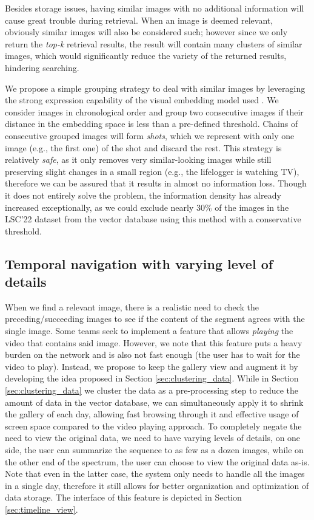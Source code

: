 Besides storage issues, having similar images with no additional information will cause great trouble during retrieval. When an image is deemed relevant, obviously similar images will also be considered such; however since we only return the \textit{top-k} retrieval results, the result will contain many clusters of similar images, which would significantly reduce the variety of the returned results, hindering searching.

We propose a simple grouping strategy to deal with similar images by leveraging the strong expression capability of the visual embedding model used \cite{radford_learning_2021}. We consider images in chronological order and group two consecutive images if their distance in the embedding space is less than a pre-defined threshold. Chains of consecutive grouped images will form \textit{shots}, which we represent with only one image (e.g., the first one) of the shot and discard the rest. This strategy is relatively \textit{safe}, as it only removes very similar-looking images while still preserving slight changes in a small region (e.g., the lifelogger is watching TV), therefore we can be assured that it results in almost no information loss. Though it does not entirely solve the problem, the information density has already increased exceptionally, as we could exclude nearly $30\%$ of the images in the LSC'22 dataset from the vector database using this method with a conservative threshold. 

\vspace{-2mm}
\subsection{Temporal navigation with varying level of details}
\label{sec:temporal_navigation}

\vspace{-2mm}
When we find a relevant image, there is a realistic need to check the preceding/succeeding images to see if the content of the segment agrees with the single image. Some teams seek to implement a feature that allows \textit{playing} the video that contains said image. However, we note that this feature puts a heavy burden on the network and is also not fast enough (the user has to wait for the video to play). Instead, we propose to keep the gallery view and augment it by developing the idea proposed in Section \ref{sec:clustering_data}. While in Section \ref{sec:clustering_data} we cluster the data as a pre-processing step to reduce the amount of data in the vector database, we can simultaneously apply it to shrink the gallery of each day, allowing fast browsing through it and effective usage of screen space compared to the video playing approach. To completely negate the need to view the original data, we need to have varying levels of details, on one side, the user can summarize the sequence to as few as a dozen images, while on the other end of the spectrum, the user can choose to view the original data as-is. Note that even in the latter case, the system only needs to handle all the images in a single day, therefore it still allows for better organization and optimization of data storage. The interface of this feature is depicted in Section \ref{sec:timeline_view}.

